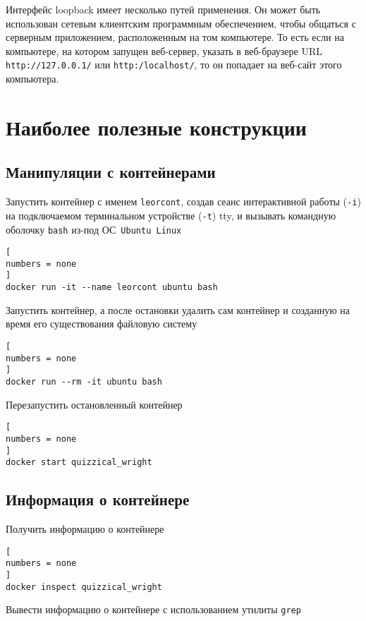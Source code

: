\documentclass[%
	11pt,
	a4paper,
	utf8,
		]{article}
\begin{document}
Интерфейс loopback имеет несколько путей применения. Он может быть использован сетевым клиентским программным обеспечением, чтобы общаться с серверным приложением, расположенным на том компьютере. То есть если на компьютере, на котором запущен веб-сервер, указать в веб-браузере URL \texttt{http://127.0.0.1/} или \texttt{http:/localhost/}, то он попадает на веб-сайт этого компьютера.

\section{Наиболее полезные конструкции}

\subsection{Манипуляции с контейнерами}

Запустить контейнер с именем \texttt{leorcont}, создав сеанс интерактивной работы (\texttt{-i}) на подключаемом терминальном устройстве (\texttt{-t}) tty, и вызывать командную оболочку \texttt{bash} из-под ОС~\texttt{Ubuntu Linux}

\begin{lstlisting}[
numbers = none
]
docker run -it --name leorcont ubuntu bash
\end{lstlisting}

Запустить контейнер, а после остановки удалить сам контейнер и созданную на время его существования файловую систему

\begin{lstlisting}[
numbers = none
]
docker run --rm -it ubuntu bash
\end{lstlisting}

Перезапустить остановленный контейнер

\begin{lstlisting}[
numbers = none
]
docker start quizzical_wright
\end{lstlisting}

\subsection{Информация о контейнере}

Получить информацию о контейнере

\begin{lstlisting}[
numbers = none
]
docker inspect quizzical_wright
\end{lstlisting}

Вывести информацию о контейнере с использованием утилиты \texttt{grep}
\end{document}

